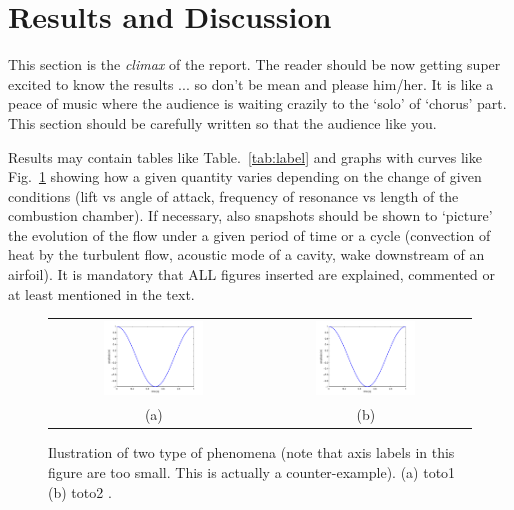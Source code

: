 \documentclass[fleqn,12pt]{NTFD} %
\begin{document}
\lipsum[9] %




\section{Results and Discussion}

This section is the {\it climax} of the report. The reader should be now getting super excited to know the results ... so don't be mean and please him/her. It is like a peace of music where the audience is waiting crazily to the `solo' of `chorus' part. This section should be carefully written so that the audience like you.

Results may contain tables like Table.~\ref{tab:label} and graphs with curves like Fig.~\ref{fig:results} showing how a given quantity varies depending on the change of given conditions (lift vs angle of attack, frequency of resonance vs length of the combustion chamber). If necessary, also snapshots should be shown to `picture' the evolution of the flow under a given period of time or a cycle (convection of heat by the turbulent flow, acoustic mode of a cavity, wake downstream of an airfoil). It is mandatory that ALL figures inserted are explained, commented or at least mentioned in the text.

\begin{figure}[tb]
\centering
\begin{tabular}{cc}
\includegraphics[width=0.5\textwidth,angle=0]{./results} & \includegraphics[width=0.5\textwidth,angle=0]{./results} \\
(a) & (b)
\end{tabular}
\caption{Ilustration of two type of  phenomena (note that axis labels in this figure are too small. This is actually a counter-example). (a) toto1 (b) toto2 .}
\label{fig:results}
\end{figure}
\end{document}
